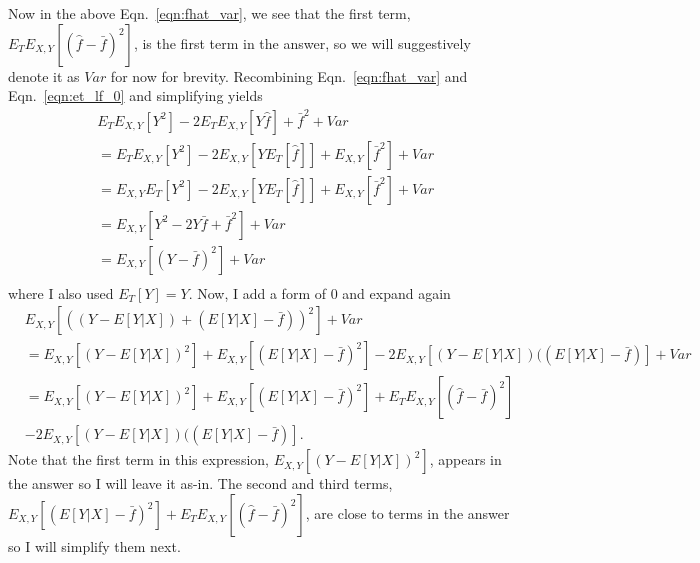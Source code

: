 \documentclass[12pt]{amsart}
\begin{document}
Now in the above Eqn.~\ref{eqn:fhat_var}, we see that the first term, $E_TE_{X,Y}[(\hat{f} - \bar{f})^2]$, is the first term in the answer, so we will suggestively denote it as $Var$ for now for brevity.  Recombining Eqn.~\ref{eqn:fhat_var} and Eqn.~\ref{eqn:et_lf_0} and simplifying yields
\begin{equation} \label{eqn:et_lf_1}
\begin{split}
& E_TE_{X,Y}[Y^2] - 2E_TE_{X,Y}[Y\hat{f}]  + \bar{f}^2 + Var \\
& = E_TE_{X,Y}[Y^2] - 2E_{X,Y}[YE_T[\hat{f}]] + E_{X,Y}[\bar{f}^2] + Var \\
& = E_{X,Y}E_T[Y^2] - 2E_{X,Y}[YE_T[\hat{f}]] + E_{X,Y}[\bar{f}^2] + Var \\
& = E_{X,Y}[Y^2 - 2Y\bar{f} +  \bar{f}^2] + Var \\
& = E_{X,Y}[(Y - \bar{f})^2] + Var \\
\end{split}
\end{equation}
where I also used $E_T[Y] = Y$.  Now, I add a form of 0 and expand again
\begin{equation} \label{eqn:et_lf_02}
\begin{split}
& E_{X,Y}[((Y - E[Y|X]) + (E[Y|X] - \bar{f}))^2] + Var \\
& = E_{X,Y}[(Y-E[Y|X])^2] + E_{X,Y}[(E[Y|X] - \bar{f})^2] - 2E_{X,Y}[(Y-E[Y|X])((E[Y|X] - \bar{f})] + Var \\
& = E_{X,Y}[(Y-E[Y|X])^2] + E_{X,Y}[(E[Y|X] - \bar{f})^2]  + E_TE_{X,Y}[(\hat{f} - \bar{f})^2]  \\
& - 2E_{X,Y}[(Y-E[Y|X])((E[Y|X] - \bar{f})].
\end{split}
\end{equation}
Note that the first term in this expression, $E_{X,Y}[(Y-E[Y|X])^2]$, appears in the answer so I will leave it as-in.  The second and third terms, $E_{X,Y}[(E[Y|X] - \bar{f})^2]  + E_TE_{X,Y}[(\hat{f} - \bar{f})^2]$, are close to terms in the answer so I will simplify them next.
\end{document}
